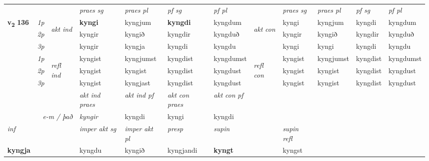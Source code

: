\begin{longtable}[l]{X>{\footnotesize\itshape}llXXXXlXXXX}
 & &   & \textit{praes sg}  & \textit{praes pl}    & \textit{ pf sg} & \textit{pf pl} & & \textit{praes sg}  & \textit{praes pl}    & \textit{pf sg} & \textit{pf pl }  \\ \cmidrule{4-7} \cmidrule{9-12}
 \multirow{2}{*}{{{\textbf{v{\textsubscript{2}}} \Large{\textbf{136}}}}}  & 1p & \multirow{3}{*}{\begin{turn}{90}\textit{akt ind}\end{turn}} & \textbf{kyngi} & kyngjum & \textbf{kyngdi} & kyngdum & \multirow{3}{*}{\begin{turn}{90}\textit{akt con}\end{turn}} &kyngi & kyngjum & kyngdi & kyngdum\\*
 & 2p &  &  kyngir  & kyngið & kyngdir & kyngduð & & kyngir & kyngið & kyngdir & kyngduð \\*
 & 3p &  & kyngir & kyngja & kyngdi & kyngdu & & kyngi & kyngi& kyngdi & kyngdu \\*
\cmidrule{4-7} \cmidrule{9-12}
 & 1p & \multirow{3}{*}{\begin{turn}{90}\textit{refl ind}\end{turn}}  & kyngist & kyngjumst & kyngdist & kyngdumst & \multirow{3}{*}{\begin{turn}{90}\textit{refl con}\end{turn}}  &kyngist & kyngjumst & kyngdist & kyngdumst \\*
 & 2p &  & kyngist & kyngist & kyngdist & kyngdust & &kyngist & kyngist & kyngdist & kyngdust \\*
 & 3p  & & kyngist & kyngjast & kyngdist & kyngdust & & kyngist & kyngist& kyngdist & kyngdust \\*
\cmidrule{4-7} \cmidrule{9-12}

   && &  \textit{akt ind praes} & \textit{akt ind pf} & \textit{akt con praes} & \textit{akt con pf} \\*
\multicolumn{3}{r}{\textit{e-m / það}} & kyngir & kyngdi & kyngi & kyngdi \\*

\cmidrule{4-7}
   {\textit{inf}} & &  & \textit{imper akt sg} & \textit{imper akt pl}   & \textit{presp} & \textit{supin} && \textit{supin refl}  \\*
  {\textbf{kyngja}} & && kyngdu  & kyngið   & kyngjandi &  \textbf{kyngt} && kyngst  \\*

\midrule


\end{longtable}
